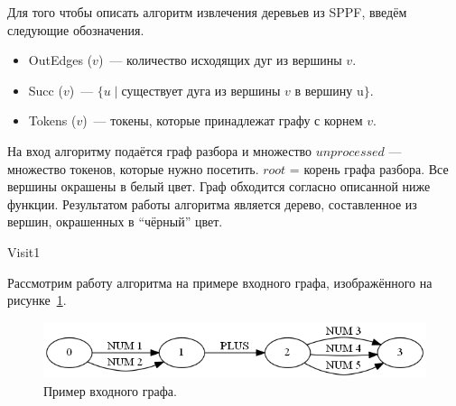 Для того чтобы описать алгоритм извлечения деревьев из SPPF, введём следующие обозначения.
\begin{itemize}
\item OutEdges ($v$)~--- количество исходящих дуг из вершины $v$. 
\item Succ ($v$)~--- $\{u \mid \mbox{существует дуга из вершины } v \mbox{ в вершину u} \}$.
\item Tokens ($v$)~--- токены, которые принадлежат графу с корнем $v$.
\end{itemize}

На вход алгоритму подаётся граф разбора и множество $unprocessed$ --- множество токенов, которые нужно посетить. $root$ = корень графа разбора. Все вершины окрашены в белый цвет. Граф обходится согласно описанной ниже функции. Результатом работы алгоритма  является дерево, составленное из вершин, окрашенных в ``чёрный'' цвет.

\begin{algorithm}
\begin{algorithmic}[1]
        \State {}
    \Else 
        \State {}
    \EndIf
  \Else
       \State {}
   \EndFor
  \EndIf
\EndFunction

\end{algorithmic}
\caption{Visit1}
\end{algorithm}

Рассмотрим работу алгоритма на примере входного графа, изображённого на рисунке~\ref{illustration_input}.

\begin{figure}[t]
\centering
\includegraphics[width=\linewidth]{Ivanov/Pictures/illustration_input.png}
\caption{Пример входного графа.}
\label{illustration_input}
\end{figure}

